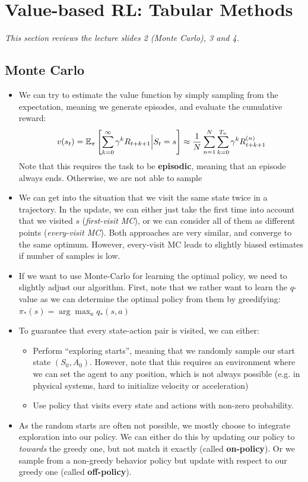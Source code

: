 \section{Value-based RL: Tabular Methods}
\textit{This section reviews the lecture slides 2 (Monte Carlo), 3 and 4.}
\subsection{Monte Carlo}
\begin{itemize}
	\item We can try to estimate the value function by simply sampling from the expectation, meaning we generate episodes, and evaluate the cumulative reward:
	$$v(s_t)=\mathbb{E}_{\pi}\left[\sum_{k=0}^{\infty} \gamma^k R_{t+k+1}\Big\vert S_t=s\right]\approx \frac{1}{N}\sum_{n=1}^{N}\sum_{k=0}^{T_{n}}\gamma^k R_{t+k+1}^{(n)}$$
	Note that this requires the task to be \textbf{episodic}, meaning that an episode always ends. Otherwise, we are not able to sample 
	\item We can get into the situation that we visit the same state twice in a trajectory. In the update, we can either just take the first time into account that we visited $s$ (\textit{first-visit MC}), or we can consider all of them as different points (\textit{every-visit MC}). Both approaches are very similar, and converge to the same optimum. However, every-visit MC leads to slightly biased estimates if number of samples is low.
	\item If we want to use Monte-Carlo for learning the optimal policy, we need to slightly adjust our algorithm. First, note that we rather want to learn the $q$-value as we can determine the optimal policy from them by greedifying: $\pi_{*}(s)=\arg\max_a q_{*}(s,a)$
	\item To guarantee that every state-action pair is visited, we can either:
	\begin{itemize}
		\item Perform ``exploring starts'', meaning that we randomly sample our start state $(S_0,A_0)$. However, note that this requires an environment where we can set the agent to any position, which is not always possible (e.g. in physical systems, hard to initialize velocity or acceleration)
		\item Use policy that visits every state and actions with non-zero probability. 
	\end{itemize}
	\item As the random starts are often not possible, we mostly choose to integrate exploration into our policy. We can either do this by updating our policy to \textit{towards} the greedy one, but not match it exactly (called \textbf{on-policy}). Or we sample from a non-greedy behavior policy but update with respect to our greedy one (called \textbf{off-policy}).
\end{itemize}
